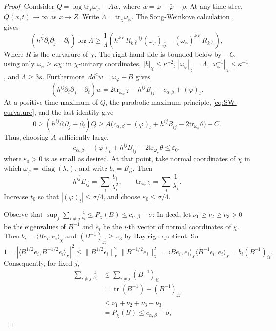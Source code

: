 \documentclass[reqno]{amsart}
\theoremstyle{remark}
\def\tr{\text{tr}}
\newcommand{\ddc}{dd^c}
\newcommand{\cab}{c_{\alpha,\beta}}
\theoremstyle{plain}
\begin{document}
\begin{proof}
    Condsider $Q=\log\tr_\chi\omega_\varphi-Aw$, where $w=\varphi-\bar{\varphi}-\rho$. At any time slice, $Q(x,t)\to \infty$ as $x\to Z$. Write $\Lambda=\tr_\chi\omega_\varphi$. The Song-Weinkove calculation \cite[Lemma 3.1]{SW08}, gives \[
    (h^{i\bar j}\partial_i\partial_{\bar{j}}-\partial_t)\log \Lambda\geq \frac{1}{\Lambda}\left(
 h^{k\bar\ell}R_{k\bar\ell}{}^{i\bar j}
                  (\omega_\varphi)_{i\bar j}
 -(\omega_\varphi)^{k\bar\ell}R_{k\bar\ell}
 \right),
    \]
    Where $R$ is the curvarure of $\chi$. The right-hand side is bounded below by $-C$, using only
$\omega_\varphi\geq\kappa\chi$: in $\chi$-unitary
coordinates, $|h|_\chi\leq\kappa^{-2}$,
$|\omega_\varphi|_\chi=\Lambda$,
$|\omega_\varphi^{-1}|_\chi\leq\kappa^{-1}$, and
$\Lambda\geq3\kappa$. Furthermore, $\ddc w=\omega_\varphi-B$ gives
\begin{equation}\label{eq:SW-curvature}
 (h^{i\bar j}\partial_i\partial_{\bar j}-\partial_t)w
 =
 2\tr_{\omega_\varphi}\chi
 -h^{i\bar j}B_{i\bar j}-\cab+(\bar{\varphi})_t.
\end{equation}
At a positive-time maximum of $Q$, the parabolic maximum principle,
\eqref{eq:SW-curvature}, and the last identity give
\[
 0\geq(h^{i\bar j}\partial_i\partial_{\bar j}-\partial_t)Q
 \geq
 A\bigl(\cab-(\bar\varphi)_t+h^{i\bar j}B_{i\bar j}
             -2\tr_{\omega_\varphi}\theta\bigr)-C.
\]
Thus, choosing $A$ sufficiently large,
\begin{equation}\label{eq:max-evolution}
 \cab-(\bar\varphi)_t+h^{i\bar j}B_{i\bar j}
 -2\tr_{\omega_\varphi}\theta
 \leq\varepsilon_0,
\end{equation}
where $\varepsilon_0>0$ is as small as desired.
At that point, take normal coordinates of $\chi$ in which
$\omega_\varphi=\operatorname{diag}(\lambda_i)$, and write
$b_i=B_{i\bar i}$.  Then
\[
 h^{i\bar j}B_{i\bar j}=\sum_i\frac{b_i}{\lambda_i^2},
 \qquad
 \tr_{\omega_\varphi}\chi=\sum_i\frac1{\lambda_i}.
\]
Increase $t_0$ so that $|(\bar\varphi)_t|\leq\sigma/4$, and choose
$\varepsilon_0\leq\sigma/4$. 

Observe that $\sup_j\sum_{i\neq j}\frac{1}{b_i}\leq P_\chi(B)\leq \cab-\sigma$: In deed, let $\nu_1\ge\nu_2\ge\nu_3>0$ be the eigenvalues of $B^{-1}$ and $e_i$ be the $i$-th vector of normal coordinates of $\chi$. Then $b_i=\langle Be_i,e_i\rangle_{\chi}$ and $(B^{-1})_{j\bar j}\geq \nu_3$ by Rayleigh quotient. So \[
1=|\langle B^{1/2}e_i,B^{-1/2}e_i\rangle_\chi|^2\leq \|B^{1/2}e_i\|_\chi^2\|B^{-1/2}e_i\|_\chi^2=\langle Be_i,e_i\rangle_\chi\langle B^{-1}e_i,e_i\rangle_\chi=b_i(B^{-1})_{i\bar i}.
\]
Consequently, for fixed $j$,
\[
\begin{aligned}
\sum_{i\ne j}\frac1{b_i}
&\le \sum_{i\ne j}(B^{-1})_{i\bar i}\\
&=\operatorname{tr}(B^{-1})-(B^{-1})_{j\bar j}\\
&\le \nu_1+\nu_2+\nu_3-\nu_3\\
&=P_\chi(B)\le\cab-\sigma,
\end{aligned}
\]


\end{proof}
\end{document}
